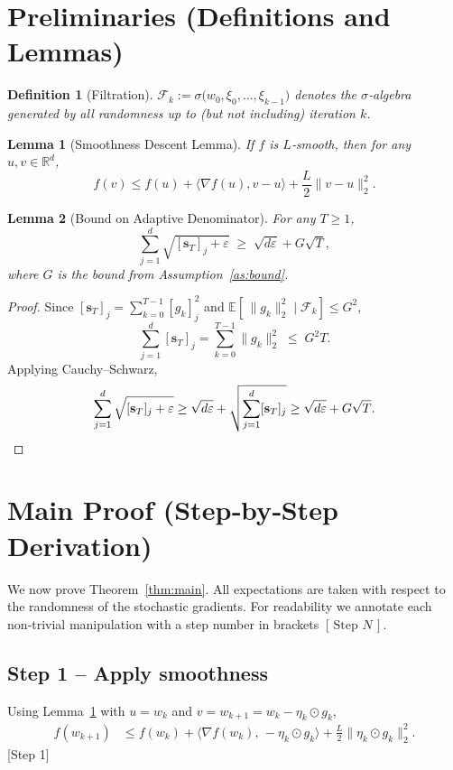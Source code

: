 \documentclass{article}
\newtheorem{lemma}{Lemma}
\newtheorem{definition}{Definition}
\begin{document}
\section*{Preliminaries (Definitions and Lemmas)}

\begin{definition}[Filtration]
\(\mathcal{F}_k:=\sigma\bigl(w_0,\xi_0,\dots,\xi_{k-1}\bigr)\) denotes the $\sigma$‑algebra generated by all randomness up to (but not including) iteration $k$.
\end{definition}

\begin{lemma}[Smoothness Descent Lemma]\label{lem:smooth}
If $f$ is $L$‑smooth, then for any $u,v\in\mathbb{R}^{d}$,
\[
f(v)\le f(u)+\langle\nabla f(u),v-u\rangle+\frac{L}{2}\|v-u\|_{2}^{2}.
\]
\end{lemma}

\begin{lemma}[Bound on Adaptive Denominator]\label{lem:denom}
For any $T\ge 1$,
\[
\sum_{j=1}^{d}\sqrt{[\mathbf{s}_{T}]_j+\varepsilon}
   \;\ge\;
   \sqrt{d\varepsilon}+ G\sqrt{T},
\]
where $G$ is the bound from Assumption~\ref{as:bound}.
\end{lemma}
\begin{proof}
Since $[\mathbf{s}_{T}]_j=\sum_{k=0}^{T-1} [g_k]_j^{2}$ and $\mathbb{E}[\,\|g_k\|_2^{2}\mid\mathcal{F}_k]\le G^{2}$,
\[
\sum_{j=1}^{d}[\mathbf{s}_{T}]_j = \sum_{k=0}^{T-1}\|g_k\|_2^{2}
   \;\le\; G^{2}T .
\]
Applying Cauchy–Schwarz,
\[
\sum_{j=1}^{d}\sqrt{[\mathbf{s}_{T}]_j+\varepsilon}
   \ge \sqrt{d\varepsilon} + \sqrt{\sum_{j=1}^{d}[\mathbf{s}_{T}]_j}
   \ge \sqrt{d\varepsilon}+ G\sqrt{T}. \qedhere
\]
\end{proof}

\section*{Main Proof (Step‑by‑Step Derivation)}

We now prove Theorem~\ref{thm:main}.  All expectations are taken with respect to the randomness of the stochastic gradients.  
For readability we annotate each non‑trivial manipulation with a step number in brackets \([\,\text{Step }N\,]\).

\subsection*{Step 1 – Apply smoothness}
Using Lemma~\ref{lem:smooth} with $u=w_k$ and $v=w_{k+1}=w_k-\eta_k\odot g_k$,
\[
\begin{aligned}
f(w_{k+1})
 &\le f(w_k) + \big\langle \nabla f(w_k),\, -\eta_k\odot g_k \big\rangle
      +\frac{L}{2}\big\| \eta_k\odot g_k \big\|_2^{2} .
\end{aligned}
\tag{4}
\]
[Step 1]
\end{document}
